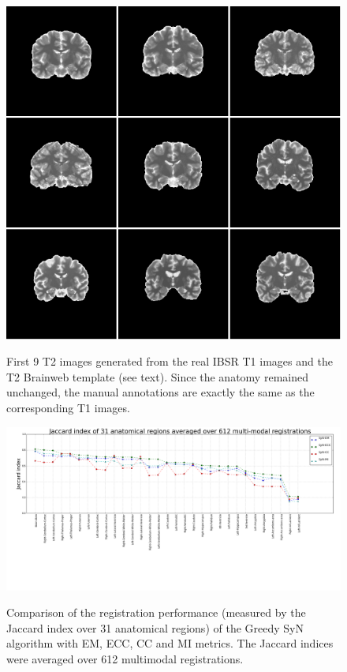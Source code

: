 \begin{figure}[H]
\centering
\includegraphics[width=1.0\linewidth]{./images/semi_synthetic.png}\\
\caption{First 9 T2 images generated from the real IBSR T1 images and the T2 Brainweb template (see text). Since the anatomy remained unchanged, the manual annotations are exactly
the same as the corresponding T1 images.}
\label{fig:semi_synthetic}
\end{figure}




\begin{figure}[H]
\centering
\includegraphics[width=1.0\linewidth]{./images/multi_lines_seg.png}\\
\caption{Comparison of the registration performance (measured by the Jaccard index over 31 anatomical regions) of the Greedy SyN algorithm with EM, ECC, CC and MI metrics. The Jaccard
indices were averaged over 612 multimodal registrations.}
\label{fig:multi_seg}
\end{figure}

